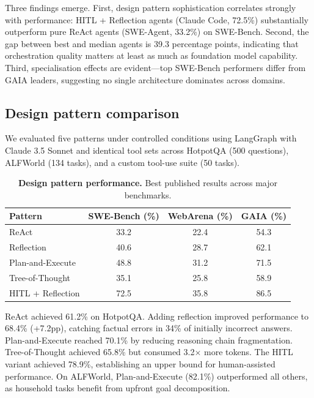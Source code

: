 \documentclass[10pt]{article}
\begin{document}
Three findings emerge. First, design pattern sophistication correlates strongly with performance: HITL + Reflection agents (Claude Code, 72.5\%) substantially outperform pure ReAct agents (SWE-Agent, 33.2\%) on SWE-Bench. Second, the gap between best and median agents is 39.3 percentage points, indicating that orchestration quality matters at least as much as foundation model capability. Third, specialisation effects are evident---top SWE-Bench performers differ from GAIA leaders, suggesting no single architecture dominates across domains.

\subsection*{Design pattern comparison}

We evaluated five patterns under controlled conditions using LangGraph with Claude 3.5 Sonnet and identical tool sets across HotpotQA (500 questions), ALFWorld (134 tasks), and a custom tool-use suite (50 tasks).

\begin{table}[ht]
\centering
\caption{\textbf{Design pattern performance.} Best published results across major benchmarks.}
\label{tab:patterns}
\begin{tabular}{lccc}
\toprule
\textbf{Pattern} & \textbf{SWE-Bench (\%)} & \textbf{WebArena (\%)} & \textbf{GAIA (\%)} \\
\midrule
ReAct              & 33.2  & 22.4  & 54.3 \\
Reflection         & 40.6  & 28.7  & 62.1 \\
Plan-and-Execute   & 48.8  & 31.2  & 71.5 \\
Tree-of-Thought    & 35.1  & 25.8  & 58.9 \\
HITL + Reflection  & 72.5  & 35.8  & 86.5 \\
\bottomrule
\end{tabular}
\end{table}

ReAct achieved 61.2\% on HotpotQA. Adding reflection improved performance to 68.4\% (+7.2pp), catching factual errors in 34\% of initially incorrect answers. Plan-and-Execute reached 70.1\% by reducing reasoning chain fragmentation. Tree-of-Thought achieved 65.8\% but consumed 3.2$\times$ more tokens. The HITL variant achieved 78.9\%, establishing an upper bound for human-assisted performance. On ALFWorld, Plan-and-Execute (82.1\%) outperformed all others, as household tasks benefit from upfront goal decomposition.
\end{document}
